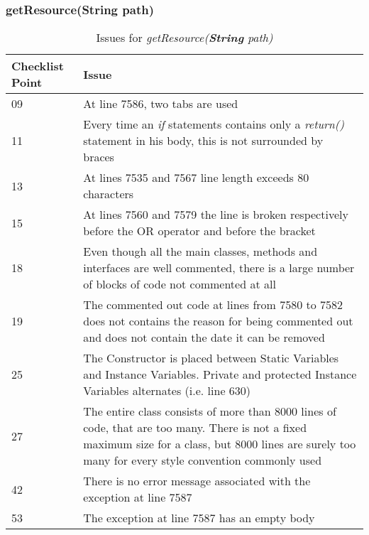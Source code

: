 \subsubsection{getResource(String path)}
\begin{table}[!htbp]
\begin{center}
\begin{tabular}[t]{p{}p{}}

\hline
\textbf{Checklist Point} & \textbf{Issue} \\
\hline
09 & At line 7586, two tabs are used  \\
\hline
11 & Every time an \textit{if} statements contains only a \textit{return()} statement in his body, this is not surrounded by braces \\
\hline
13 & At lines 7535 and 7567 line length exceeds 80 characters \\
\hline
15 & At lines 7560 and 7579 the line is broken respectively before the OR operator and before the bracket \\
\hline
18 & Even though all the main classes, methods and interfaces are well commented, there is a large number of blocks of code not commented at all \\
\hline
19 & The commented out code at lines from 7580 to 7582 does not contains the reason for being commented out and does not contain the date it can be removed \\
\hline
25 & The Constructor is placed between Static Variables and  Instance Variables. Private and protected Instance Variables alternates (i.e. line 630)  \\
\hline
27 & The entire class consists of more than 8000 lines of code, that are too many. There is not a fixed maximum size for a class, but 8000 lines are surely too many for every style convention commonly used \\
\hline
42 & There is no error message associated with the exception at line 7587 \\
\hline
53 & The exception at line 7587 has an empty body \\
\hline

\end{tabular}
\end{center}
\caption{Issues for \textit{getResource(\textbf{String} path)}}
\end{table}
\clearpage

